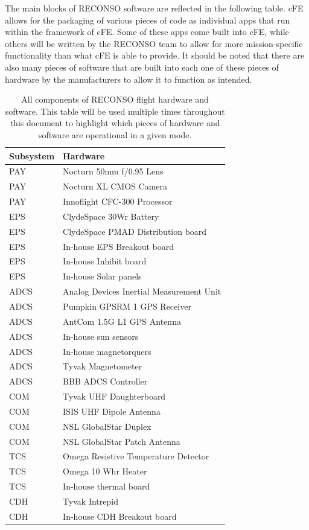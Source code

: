 \documentclass{article}
\begin{document}
The main blocks of RECONSO software are reflected in the following table. cFE allows for the packaging of various pieces of code as individual apps that run within the framework of cFE. Some of these apps come built into cFE, while others will be written by the RECONSO team to allow for more mission-specific functionality than what cFE is able to provide. It should be noted that there are also many pieces of software that are built into each one of these pieces of hardware by the manufacturers to allow it to function as intended.

\begin{table}[h!]
\caption{All components of RECONSO flight hardware and software. This table will be used multiple times throughout this document to highlight which pieces of hardware and software are operational in a given mode.}
\begin{adjustbox}{center}
\begin{tabular}{|l|l|}
\hline
Subsystem & Hardware \\ \hline \hline
PAY & Nocturn 50mm f/0.95 Lens  \\ \hline
PAY & Nocturn XL CMOS Camera  \\ \hline
PAY & Innoflight CFC-300 Processor  \\ \hline \hline
EPS & ClydeSpace 30Wr Battery \\ \hline
EPS & ClydeSpace PMAD Distribution board  \\ \hline
EPS & In-house EPS Breakout board \\ \hline
EPS & In-house Inhibit board  \\ \hline
EPS & In-house Solar panels  \\ \hline \hline
ADCS & Analog Devices Inertial Measurement Unit  \\ \hline
ADCS & Pumpkin GPSRM 1 GPS Receiver \\ \hline
ADCS & AntCom 1.5G L1 GPS Antenna  \\ \hline
ADCS & In-house sun sensors  \\ \hline
ADCS & In-house magnetorquers  \\ \hline
ADCS & Tyvak Magnetometer \\ \hline
ADCS & BBB ADCS Controller \\ \hline \hline
COM & Tyvak UHF Daughterboard  \\ \hline
COM & ISIS UHF Dipole Antenna  \\ \hline
COM & NSL GlobalStar Duplex  \\ \hline
COM & NSL GlobalStar Patch Antenna \\ \hline \hline
TCS & Omega Resistive Temperature Detector \\ \hline
TCS & Omega 10 Whr Heater  \\ \hline
TCS & In-house thermal board \\ \hline \hline
CDH & Tyvak Intrepid \\ \hline
CDH & In-house CDH Breakout board \\ \hline 
\end{tabular}


\end{adjustbox}
\end{table}
\end{document}
